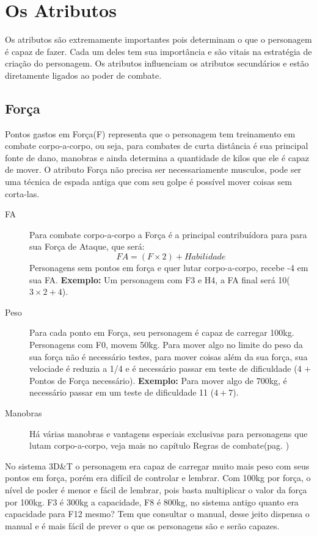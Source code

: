 \chapter{Os Atributos}
\label{ch:attributes}

Os atributos são extremamente importantes pois determinam o que o personagem é capaz de fazer. Cada um deles tem sua importância e são vitais na estratégia de criação do personagem. Os atributos influenciam os atributos secundários e estão diretamente ligados ao poder de combate. 

\section{Força}

Pontos gastos em Força(F) representa que o personagem tem treinamento em combate corpo-a-corpo, ou seja, para combates de curta distância é sua principal fonte de dano, manobras e ainda determina a quantidade de kilos que ele é capaz de mover. O atributo Força não precisa ser necessariamente musculos, pode ser uma técnica de espada antiga que com seu golpe é possível mover coisas sem corta-las.

\begin{description}
\item[FA] Para combate corpo-a-corpo a Força é a principal contribuídora para para sua Força de Ataque, que será: 
\[ FA = (F \times 2) + Habilidade \]
Personagens sem pontos em força e quer lutar corpo-a-corpo, recebe -4 em sua FA. {\bf Exemplo:} Um personagem com F3 e H4, a FA final será 10(\(3 \times 2 + 4 \)). 
\item[Peso] Para cada ponto em Força, seu personagem é capaz de carregar 100kg. Personagens com F0, movem 50kg. Para mover algo no limite do peso da sua força não é necessário testes, para mover coisas além da sua força, sua velociade é reduzia a 1/4 e é necessário passar em teste de dificuldade (4 + Pontos de Força necessário). {\bf Exemplo:} Para mover algo de 700kg, é necessário passar em um teste de dificuldade 11 (\(4 + 7\)).
\item[Manobras] Há várias manobras e vantagens especiais exclusivas para personagens que lutam corpo-a-corpo, veja mais no capítulo Regras de combate(pag. \pageref{ch:combat})
\end{description}

\begin{framed}
No sistema 3D\&T o personagem era capaz de carregar muito mais peso com seus pontos em força, porém era difícil de controlar e lembrar. Com 100kg por força, o nível de poder é menor e fácil de lembrar, pois basta multiplicar o valor da força por 100kg. F3 é 300kg a capacidade, F8 é 800kg, no sistema antigo quanto era capacidade para F12 mesmo? Tem que consultar o manual, desse jeito dispensa o manual e é mais fácil de prever o que os personagens são e serão capazes.
\end{framed}


